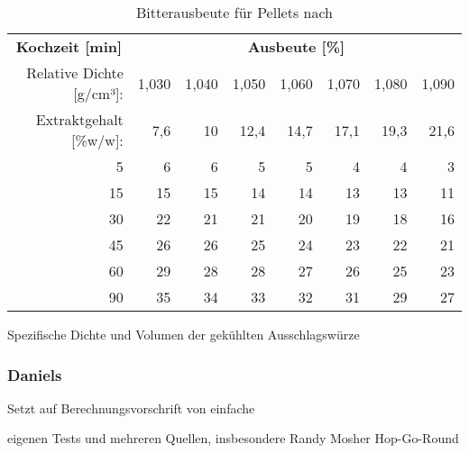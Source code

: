 \documentclass[a4paper,parskip=half]{scrartcl}
\begin{document}
\begin{table}[H]
\centering
\begin{tabular}{rrrrrrrr} 
\toprule
\multicolumn{1}{c}{\textbf{Kochzeit [min]}} & \multicolumn{7}{c}{\textbf{Ausbeute [\%]}}  \\
Relative Dichte [g/cm³]:                                        & 1,030 & 1,040 & 1,050 & 1,060 & 1,070 & 1,080  & 1,090                   \\
Extraktgehalt [\%w/w]:                                            & 7,6 & 10 & 12,4 & 14,7 & 17,1 & 19,3  & 21,6                   \\  
\midrule
5                                            & 6     & 6     & 5     & 5     & 4     & 4      & 3                          \\
15                                           & 15    & 15    & 14    & 14    & 13    & 13     & 11                         \\
30                                           & 22    & 21    & 21    & 20    & 19    & 18     & 16                         \\
45                                           & 26    & 26    & 25    & 24    & 23    & 22     & 21                         \\
60                                           & 29    & 28    & 28    & 27    & 26    & 25     & 23                         \\
90                                           & 35    & 34    & 33    & 32    & 31    & 29     & 27                         \\
\bottomrule
\end{tabular}
\caption{Bitterausbeute für Pellets nach \citeauthor{Mosher1994} \parencite[51]{Holle2010}}
\label{table:mosherutilpellets}
\end{table}

\parencite[53]{Holle2010}
Spezifische Dichte und Volumen der gekühlten Ausschlagswürze


                              

\subsubsection*{Daniels}

\parencite[80]{Daniels1996}
Setzt auf Berechnungsvorschrift von \citeauthor{Rager1990}
einfache

eigenen Tests und mehreren Quellen, insbesondere Randy Mosher
Hop-Go-Round
\end{document}
